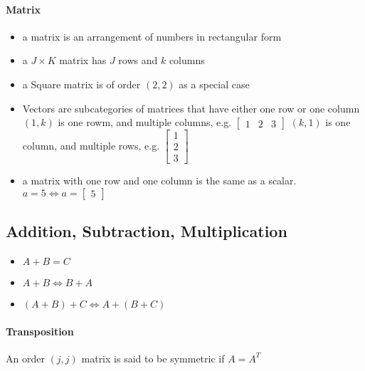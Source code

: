 \documentclass{article}
\theoremstyle{definition}
\theoremstyle{remark}
\begin{document}
\paragraph{Matrix}
\begin{itemize}
    \item a matrix is an arrangement of numbers in rectangular form
    \item a $J \times K$ matrix has $J$ rows and $k$ columns
    \item a Square matrix is of order $(2,2)$ as a special case
    \item Vectors are subcategories of matrices that have either one row or one column
    \subitem $(1,k)$ is one rowm, and multiple columns, e.g. $\begin{bmatrix} 1 & 2 & 3 \end{bmatrix}$
    \subitem $(k,1)$ is one column, and multiple rows, e.g. $\begin{bmatrix} 1 \\ 2 \\ 3 \end{bmatrix}$
    \item a matrix with one row and one column is the same as a scalar. $a = 5 \Leftrightarrow a = \begin{bmatrix}
        5
    \end{bmatrix}$
\end{itemize}

\subsection{Addition, Subtraction, Multiplication}

\begin{itemize}
    \item $A + B = C$
    \item $A + B \Leftrightarrow B + A$
    \item $(A + B) + C \Leftrightarrow A + (B + C)$
\end{itemize}

\paragraph{Transposition}
An order $(j,j)$ matrix is said to be symmetric if $A = A^T$
\end{document}
